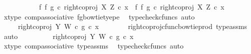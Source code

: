 \begin{isabellebody}
\ \ \isamarkupfalse%
\ {\isacharminus}{\kern0pt}\ \isanewline
\ \ \ \ \isamarkupfalse%
\ {\isachardoublequoteopen}{\isacharparenleft}{\kern0pt}f\ {\isasymbowtie}\isactrlsub f\ g{\isacharparenright}{\kern0pt}\ {\isasymcirc}\isactrlsub c\ right{\isacharunderscore}{\kern0pt}coproj\ X\ Z\ {\isasymcirc}\isactrlsub c\ x\ {\isacharequal}{\kern0pt}\ {\isacharparenleft}{\kern0pt}{\isacharparenleft}{\kern0pt}f\ {\isasymbowtie}\isactrlsub f\ g{\isacharparenright}{\kern0pt}\ {\isasymcirc}\isactrlsub c\ right{\isacharunderscore}{\kern0pt}coproj\ X\ Z{\isacharparenright}{\kern0pt}\ {\isasymcirc}\isactrlsub c\ x{\isachardoublequoteclose}\isanewline
\ \ \ \ \ \ \isamarkupfalse%
\ x{\isacharunderscore}{\kern0pt}type{}\ comp{\isacharunderscore}{\kern0pt}associative{}\ fg{\isacharunderscore}{\kern0pt}bowtie{\isacharunderscore}{\kern0pt}tyepe\ \isamarkupfalse%
\ {\isacharparenleft}{\kern0pt}typecheck{\isacharunderscore}{\kern0pt}cfuncs{\isacharcomma}{\kern0pt}\ auto{\isacharparenright}{\kern0pt}\isanewline
\ \ \ \ \isamarkupfalse%
\ \isamarkupfalse%
\ \ {\isachardoublequoteopen}{\isachardot}{\kern0pt}{\isachardot}{\kern0pt}{\isachardot}{\kern0pt}\ {\isacharequal}{\kern0pt}\ \ {\isacharparenleft}{\kern0pt}right{\isacharunderscore}{\kern0pt}coproj\ Y\ W\ {\isasymcirc}\isactrlsub c\ g{\isacharparenright}{\kern0pt}\ {\isasymcirc}\isactrlsub c\ x{\isachardoublequoteclose}\isanewline
\ \ \ \ \ \ \isamarkupfalse%
\ right{\isacharunderscore}{\kern0pt}coproj{\isacharunderscore}{\kern0pt}cfunc{\isacharunderscore}{\kern0pt}bowtie{\isacharunderscore}{\kern0pt}prod\ type{\isacharunderscore}{\kern0pt}assms\ \isamarkupfalse%
\ auto\isanewline
\ \ \ \ \isamarkupfalse%
\ \isamarkupfalse%
\ {\isachardoublequoteopen}{\isachardot}{\kern0pt}{\isachardot}{\kern0pt}{\isachardot}{\kern0pt}\ {\isacharequal}{\kern0pt}\ right{\isacharunderscore}{\kern0pt}coproj\ Y\ W\ {\isasymcirc}\isactrlsub c\ g\ {\isasymcirc}\isactrlsub c\ x{\isachardoublequoteclose}\isanewline
\ \ \ \ \ \ \isamarkupfalse%
\ x{\isacharunderscore}{\kern0pt}type{}\ comp{\isacharunderscore}{\kern0pt}associative{}\ type{\isacharunderscore}{\kern0pt}assms{\isacharparenleft}{\kern0pt}{}{\isacharparenright}{\kern0pt}\ \isamarkupfalse%
\ {\isacharparenleft}{\kern0pt}typecheck{\isacharunderscore}{\kern0pt}cfuncs{\isacharcomma}{\kern0pt}\ auto{\isacharparenright}{\kern0pt}\isanewline

\end{isabellebody}
